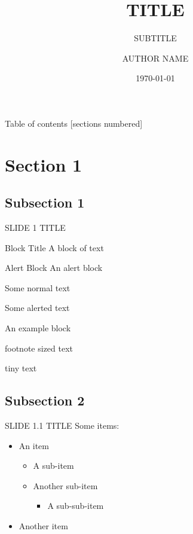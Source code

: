 \documentclass[10pt,xcolor={dvipsnames},aspectratio=169]{beamer}
\title{TITLE}
\subtitle{SUBTITLE}
\date{\today}
\author{AUTHOR NAME}
\institute{INSTITUTE}
\begin{document}
\maketitle

\begin{frame}{Table of contents}
  [sections numbered]
  \tableofcontents%
\end{frame}

\section{Section 1}

\subsection{Subsection 1}

\begin{frame}{SLIDE 1 TITLE}
  \begin{block}{Block Title}
    A block of text
  \end{block}
  \begin{alertblock}{Alert Block}
    An alert block
  \end{alertblock}
  Some normal text

  Some \alert{alerted} text

  \begin{example}
    An example block
  \end{example}

  \footnotesize{footnote sized text}

  \tiny{tiny text}
\end{frame}

\subsection{Subsection 2}

\begin{frame}{SLIDE 1.1 TITLE}
  Some items:
  \begin{itemize}
    \item An item
      \begin{itemize}
        \item A sub-item
        \item Another sub-item
          \begin{itemize}
            \item A sub-sub-item
          \end{itemize}
      \end{itemize}
    \item Another item
  \end{itemize}
\end{frame}
\end{document}
